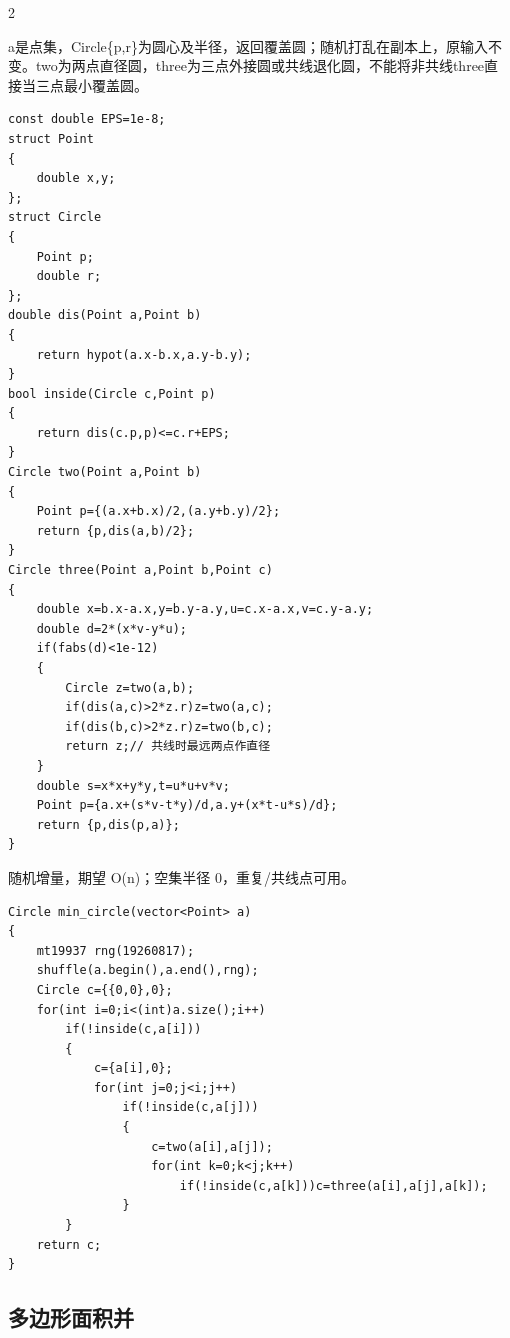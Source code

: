 \documentclass[UTF8,fontset=fandol,a4paper,twoside]{ctexart}
\newcommand{\note}[1]{{\fontsize{10}{12}\selectfont #1\par}}
\begin{document}
\begin{multicols}{2}
\note{a是点集，Circle\{p,\allowbreak{}r\}为圆心及半径，返回覆盖圆；随机打乱在副本上，原输入不变。two为两点直径圆，three为三点外接圆或共线退化圆，不能将非共线three直接当三点最小覆盖圆。}
\begin{lstlisting}
const double EPS=1e-8;
struct Point
{
    double x,y;
};
struct Circle
{
    Point p;
    double r;
};
double dis(Point a,Point b)
{
    return hypot(a.x-b.x,a.y-b.y);
}
bool inside(Circle c,Point p)
{
    return dis(c.p,p)<=c.r+EPS;
}
Circle two(Point a,Point b)
{
    Point p={(a.x+b.x)/2,(a.y+b.y)/2};
    return {p,dis(a,b)/2};
}
Circle three(Point a,Point b,Point c)
{
    double x=b.x-a.x,y=b.y-a.y,u=c.x-a.x,v=c.y-a.y;
    double d=2*(x*v-y*u);
    if(fabs(d)<1e-12)
    {
        Circle z=two(a,b);
        if(dis(a,c)>2*z.r)z=two(a,c);
        if(dis(b,c)>2*z.r)z=two(b,c);
        return z;// 共线时最远两点作直径
    }
    double s=x*x+y*y,t=u*u+v*v;
    Point p={a.x+(s*v-t*y)/d,a.y+(x*t-u*s)/d};
    return {p,dis(p,a)};
}
\end{lstlisting}
\note{随机增量，期望 O(\allowbreak{}n)\allowbreak{}；空集半径 0，重复/\allowbreak{}共线点可用。}
\begin{lstlisting}
Circle min_circle(vector<Point> a)
{
    mt19937 rng(19260817);
    shuffle(a.begin(),a.end(),rng);
    Circle c={{0,0},0};
    for(int i=0;i<(int)a.size();i++)
        if(!inside(c,a[i]))
        {
            c={a[i],0};
            for(int j=0;j<i;j++)
                if(!inside(c,a[j]))
                {
                    c=two(a[i],a[j]);
                    for(int k=0;k<j;k++)
                        if(!inside(c,a[k]))c=three(a[i],a[j],a[k]);
                }
        }
    return c;
}
\end{lstlisting}
\subsection{多边形面积并}


\end{multicols}
\end{document}
